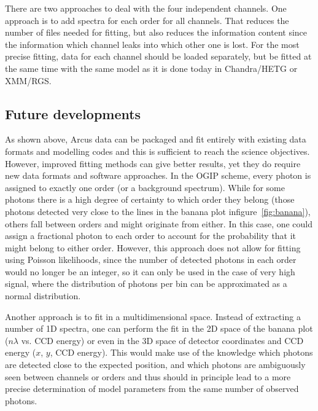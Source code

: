 \documentclass[12pt]{spieman}  %
\begin{document}
\begin{spacing}{2}
There are two approaches to deal with the four independent channels. One approach is to add spectra for each order for all channels. That reduces the number of files needed for fitting, but also reduces the information content since the information which channel leaks into which other one is lost. For the most precise fitting, data for each channel should be loaded separately, but be fitted at the same time with the same model as it is done today in Chandra/HETG or XMM/RGS.

\subsection{Future developments}
As shown above, Arcus data can be packaged and fit entirely with existing data formats and modelling codes and this is sufficient to reach the science objectives. However, improved fitting methods can give better results, yet they do require new data formats and software approaches. In the OGIP scheme, every photon is assigned to exactly one order (or a background spectrum).
While for some photons there is a high degree of certainty to which order they belong (those photons detected very close to the lines in the banana plot infigure~\ref{fig:banana}), others fall between orders and might originate from either. In this case, one could assign a fractional photon to each order to account for the probability that it might belong to either order. However, this approach does not allow for fitting using Poisson likelihoods, since the number of detected photons in each order would no longer be an integer, so it can only be used in the case of very high signal, where the distribution of photons per bin can be approximated as a normal distribution.

Another approach is to fit in a multidimensional space. Instead of extracting a number of 1D spectra, one can perform the fit in the 2D space of the banana plot ($n\lambda$ vs. CCD energy) or even in the 3D space of detector coordinates and CCD energy ($x$, $y$, CCD energy). This would make use of the knowledge which photons are detected close to the expected position, and which photons are ambiguously seen between channels or orders and thus should in principle lead to a more precise determination of model parameters from the same number of observed photons.


\end{spacing}
\end{document}
